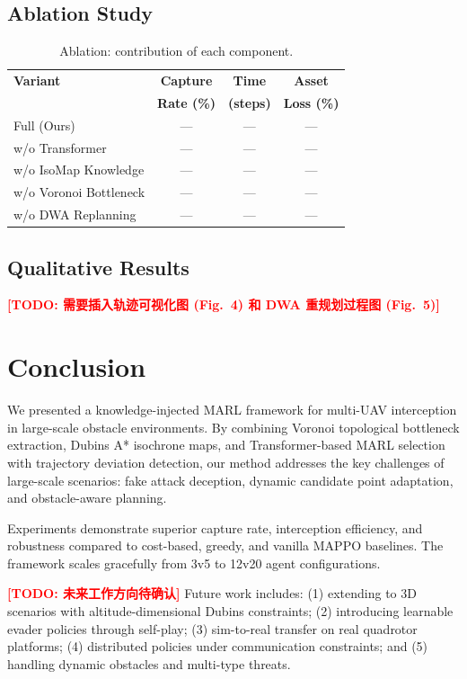 \documentclass[10pt,conference]{IEEEtran}
\newcommand{\marktodo}[1]{\textcolor{red}{\textbf{[TODO: #1]}}}
\begin{document}
\subsection{Ablation Study}

\begin{table}[h]
\centering
\caption{Ablation: contribution of each component.}
\label{tab:ablation}
\begin{tabular}{@{}lccc@{}}
\toprule
\textbf{Variant} & \textbf{Capture} & \textbf{Time} & \textbf{Asset} \\
 & \textbf{Rate (\%)} & \textbf{(steps)} & \textbf{Loss (\%)} \\
\midrule
Full (Ours) & --- & --- & --- \\
w/o Transformer & --- & --- & --- \\
w/o IsoMap Knowledge & --- & --- & --- \\
w/o Voronoi Bottleneck & --- & --- & --- \\
w/o DWA Replanning & --- & --- & --- \\
\bottomrule
\end{tabular}
\end{table}

\subsection{Qualitative Results}

\marktodo{需要插入轨迹可视化图 (Fig.~4) 和 DWA 重规划过程图 (Fig.~5)}

\section{Conclusion}

We presented a knowledge-injected MARL framework for multi-UAV interception in large-scale obstacle environments. By combining Voronoi topological bottleneck extraction, Dubins A* isochrone maps, and Transformer-based MARL selection with trajectory deviation detection, our method addresses the key challenges of large-scale scenarios: fake attack deception, dynamic candidate point adaptation, and obstacle-aware planning.

Experiments demonstrate superior capture rate, interception efficiency, and robustness compared to cost-based, greedy, and vanilla MAPPO baselines. The framework scales gracefully from 3v5 to 12v20 agent configurations.

\marktodo{未来工作方向待确认}
Future work includes: (1) extending to 3D scenarios with altitude-dimensional Dubins constraints; (2) introducing learnable evader policies through self-play; (3) sim-to-real transfer on real quadrotor platforms; (4) distributed policies under communication constraints; and (5) handling dynamic obstacles and multi-type threats.



\end{document}
